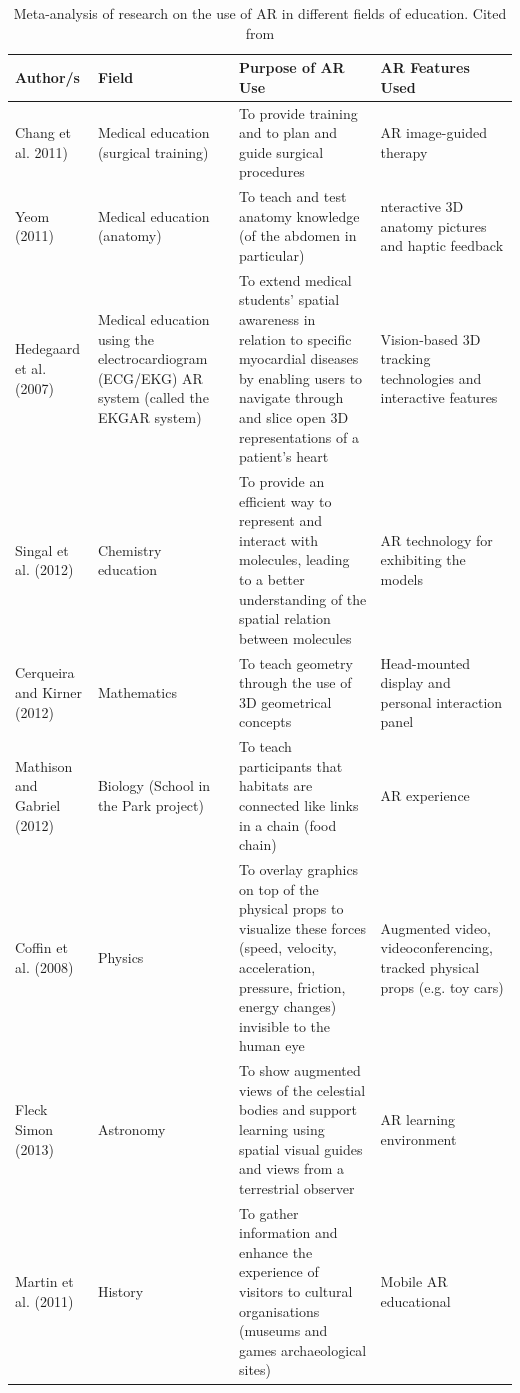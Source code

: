 \documentclass[12 pct]{report}
\begin{document}
\begin{table}[H]
\centering
 \begin{tabular}{||p{20mm} p{30mm} p{40mm} p{30mm}||} 
 \hline
 Author/s & Field & Purpose of AR Use & AR Features Used \\ [0.5ex] 
 \hline\hline
 Chang et al. 2011) & Medical education (surgical training) & To provide training and to plan and guide surgical procedures & AR image-guided therapy \\ 
 Yeom (2011) & Medical education (anatomy) & To teach and test anatomy knowledge (of the abdomen in particular)  & nteractive 3D anatomy pictures and haptic feedback \\
 Hedegaard et al.(2007) & Medical education using the electrocardiogram (ECG/EKG) AR system (called the EKGAR system) & To extend medical students’ spatial awareness in relation to specific myocardial diseases by enabling users to navigate through and slice open 3D representations of a patient’s heart & Vision-based 3D tracking technologies and interactive features \\
 Singal et al. (2012) & Chemistry education & To provide an efficient way to represent and interact with molecules, leading to a better understanding of the spatial relation between molecules & AR technology for exhibiting the models \\
 Cerqueira and Kirner (2012) & Mathematics & To teach geometry through the use of 3D geometrical concepts & Head-mounted display and personal interaction panel  \\ 
 Mathison and Gabriel (2012) & Biology (School in the Park project) & To teach participants that habitats are connected like links in a chain (food chain) & AR experience  \\
 Coffin et al. (2008) &  Physics & To overlay graphics on top of the physical props to visualize these forces (speed, velocity, acceleration, pressure, friction, energy changes) invisible to the human eye  & Augmented video, videoconferencing, tracked physical props (e.g. toy cars) \\
 Fleck Simon (2013) & Astronomy  & To show augmented views of the celestial bodies and support learning using spatial visual guides and views from a terrestrial observer & AR learning environment \\
 Martin et al. (2011) & History & To gather information and enhance the experience of visitors to cultural organisations (museums and games archaeological sites) & Mobile AR educational \\
 \hline
 \end{tabular}
  \caption{Meta-analysis of research on the use of AR in different fields of education. Cited from  \cite{note1}}\label{tab:a}
\end{table}
\end{document}
